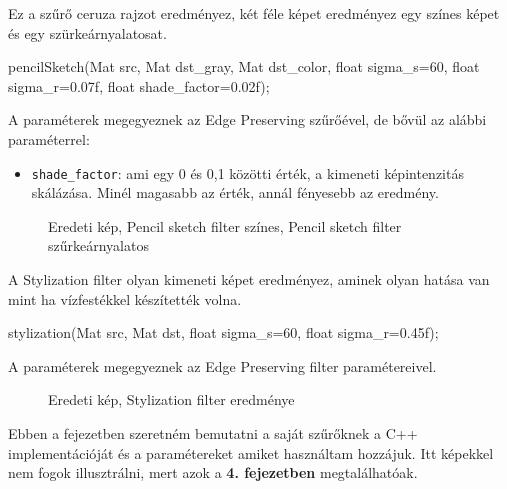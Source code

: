 
Ez a szűrő ceruza rajzot eredményez, két féle képet eredményez egy színes képet és egy szürkeárnyalatosat.
\begin{cpp}
pencilSketch(Mat src, Mat dst_gray, Mat dst_color, float sigma_s=60, 
		float sigma_r=0.07f, float shade_factor=0.02f);
\end{cpp}
A paraméterek megegyeznek az Edge Preserving szűrőével, de bővül az alábbi paraméterrel:
\begin{itemize}
    \item \texttt{shade\_factor}: ami egy 0 és 0,1 közötti érték, a kimeneti képintenzitás skálázása. Minél magasabb az érték, annál fényesebb az eredmény.
\end{itemize}

\begin{figure}[ht]
\centering
{}
\caption{Eredeti kép, Pencil sketch filter színes, Pencil sketch filter szűrkeárnyalatos} 
\label{fig:pencil_sketch_color_grey}
\end{figure}


A Stylization filter olyan kimeneti képet eredményez, aminek olyan hatása van mint ha vízfestékkel készítették volna.
\begin{cpp}
stylization(Mat src, Mat dst, float sigma_s=60, float sigma_r=0.45f);
\end{cpp}
A paraméterek megegyeznek az Edge Preserving filter paramétereivel. 

\begin{figure}[ht]
\centering
{}
\caption{Eredeti kép, Stylization filter eredménye} 
\label{fig:stylization}
\end{figure}




Ebben a fejezetben szeretném bemutatni a saját szűrőknek a C++ implementációját és a paramétereket amiket használtam hozzájuk. Itt képekkel nem fogok illusztrálni, mert azok a \textbf{4. fejezetben} megtalálhatóak.

